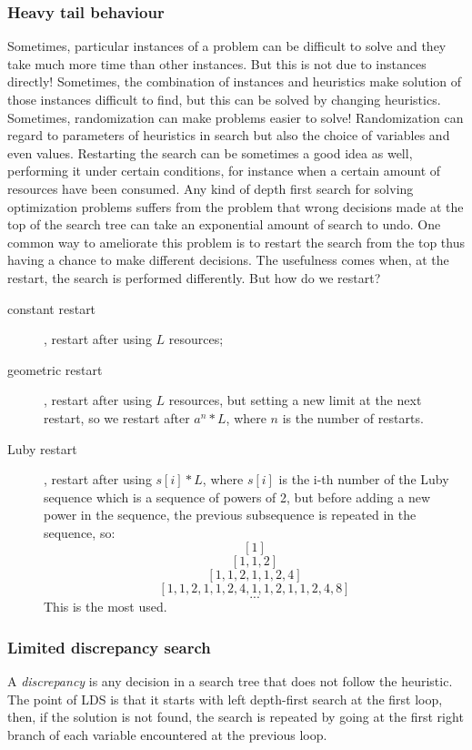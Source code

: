 \documentclass[10pt,a4paper]{article}
\begin{document}
\subsubsection{Heavy tail behaviour}
Sometimes, particular instances of a problem can be difficult to solve and they
take much more time than other instances. But this is not due to instances
directly! Sometimes, the combination of instances and heuristics make solution
of those instances difficult to find, but this can be solved by changing
heuristics. Sometimes, randomization can make problems easier to solve!
Randomization can regard to parameters of heuristics in search but also the
choice of variables and even values. Restarting the search can be sometimes a
good idea as well, performing it under certain conditions, for instance when a
certain amount of resources have been consumed. Any kind of depth first search
for solving optimization problems suffers from the problem that wrong decisions
made at the top of the search tree can take an exponential amount of search to
undo. One common way to ameliorate this problem is to restart the search from
the top thus having a chance to make different decisions. The usefulness comes
when, at the restart, the search is performed differently. But how do we
restart?

\begin{description}
    \item[constant restart], restart after using $L$ resources;
    \item[geometric restart], restart after using $L$ resources, but setting a
    new limit at the next restart, so we restart after $a^n*L$, where $n$ is the
    number of restarts.
    \item[Luby restart], restart after using $s[i]*L$, where $s[i]$ is the i-th
    number of the Luby sequence which is a sequence of powers of 2, but before
    adding a new power in the sequence, the previous subsequence is repeated in
    the sequence, so:
    \[ [1] \]
    \[ [1, 1, 2] \]
    \[ [1, 1, 2, 1, 1, 2, 4] \]
    \[ [1, 1, 2, 1, 1, 2, 4, 1, 1, 2, 1, 1, 2, 4, 8] \]
    \[ ... \]
    This is the most used.
\end{description}

\subsubsection{Limited discrepancy search}
A \textit{discrepancy} is any decision in a search tree that does not follow the
heuristic. The point of LDS is that it starts with left depth-first search at
the first loop, then, if the solution is not found, the search is repeated by
going at the first right branch of each variable encountered at the previous
loop.
\end{document}
